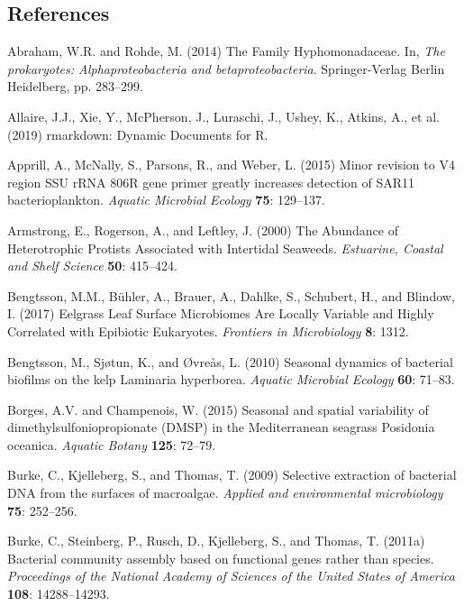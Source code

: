 \documentclass[12pt,]{article}
\begin{document}
\hypertarget{references}{%
\subsection{References}\label{references}}

\hypertarget{refs}{}
\leavevmode\hypertarget{ref-Abraham2014}{}%
Abraham, W.R. and Rohde, M. (2014) The Family Hyphomonadaceae. In,
\emph{The prokaryotes: Alphaproteobacteria and betaproteobacteria}.
Springer-Verlag Berlin Heidelberg, pp. 283--299.

\leavevmode\hypertarget{ref-Allaire2019}{}%
Allaire, J.J., Xie, Y., McPherson, J., Luraschi, J., Ushey, K., Atkins,
A., et al. (2019) rmarkdown: Dynamic Documents for R.

\leavevmode\hypertarget{ref-Apprill2015}{}%
Apprill, A., McNally, S., Parsons, R., and Weber, L. (2015) Minor
revision to V4 region SSU rRNA 806R gene primer greatly increases
detection of SAR11 bacterioplankton. \emph{Aquatic Microbial Ecology}
\textbf{75}: 129--137.

\leavevmode\hypertarget{ref-Armstrong2000}{}%
Armstrong, E., Rogerson, A., and Leftley, J. (2000) The Abundance of
Heterotrophic Protists Associated with Intertidal Seaweeds.
\emph{Estuarine, Coastal and Shelf Science} \textbf{50}: 415--424.

\leavevmode\hypertarget{ref-Bengtsson2017}{}%
Bengtsson, M.M., Bühler, A., Brauer, A., Dahlke, S., Schubert, H., and
Blindow, I. (2017) Eelgrass Leaf Surface Microbiomes Are Locally
Variable and Highly Correlated with Epibiotic Eukaryotes.
\emph{Frontiers in Microbiology} \textbf{8}: 1312.

\leavevmode\hypertarget{ref-Bengtsson2010}{}%
Bengtsson, M., Sjøtun, K., and Øvreås, L. (2010) Seasonal dynamics of
bacterial biofilms on the kelp Laminaria hyperborea. \emph{Aquatic
Microbial Ecology} \textbf{60}: 71--83.

\leavevmode\hypertarget{ref-Borges2015}{}%
Borges, A.V. and Champenois, W. (2015) Seasonal and spatial variability
of dimethylsulfoniopropionate (DMSP) in the Mediterranean seagrass
Posidonia oceanica. \emph{Aquatic Botany} \textbf{125}: 72--79.

\leavevmode\hypertarget{ref-Burke2009}{}%
Burke, C., Kjelleberg, S., and Thomas, T. (2009) Selective extraction of
bacterial DNA from the surfaces of macroalgae. \emph{Applied and
environmental microbiology} \textbf{75}: 252--256.

\leavevmode\hypertarget{ref-Burke2011a}{}%
Burke, C., Steinberg, P., Rusch, D., Kjelleberg, S., and Thomas, T.
(2011a) Bacterial community assembly based on functional genes rather
than species. \emph{Proceedings of the National Academy of Sciences of
the United States of America} \textbf{108}: 14288--14293.
\end{document}

